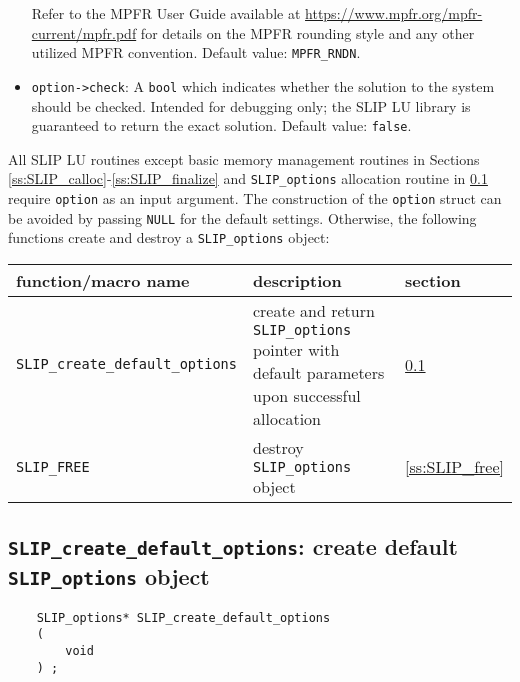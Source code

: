 \documentclass[12pt]{article}
\theoremstyle{definition}
\begin{document}
\begin{itemize}
\noindent Refer to the MPFR User Guide available at
\url{https://www.mpfr.org/mpfr-current/mpfr.pdf} for details on the MPFR
rounding style and any other utilized MPFR convention. Default value:
\verb|MPFR_RNDN|.

\item
\verb|option->check|: A \verb|bool| which indicates whether the solution to the
system should be checked. Intended for debugging only; the SLIP LU library is
guaranteed to return the exact solution. Default value: \verb|false|.

\end{itemize}

All SLIP LU routines except basic memory management routines in Sections
\ref{ss:SLIP_calloc}-\ref{ss:SLIP_finalize} and \verb|SLIP_options| allocation
routine in \ref{ss:create_default_options} require \verb|option| as an input
argument.  The construction of the \verb|option| struct can be avoided by
passing \verb|NULL| for the default settings.  Otherwise, the following
functions create and destroy a \verb|SLIP_options| object:

\begin{center}
\begin{tabular}{lp{2.5in}l}
\hline
function/macro name & description & section \\
\hline
\verb|SLIP_create_default_options|
    & create and return \verb|SLIP_options| pointer
      with default parameters upon successful allocation
    & \ref{ss:create_default_options} \\
\hline
\verb|SLIP_FREE|
    & destroy \verb|SLIP_options| object
    & \ref{ss:SLIP_free} \\
\hline
\end{tabular}
\end{center}

\cprotect\subsection{\verb|SLIP_create_default_options|: create default \verb|SLIP_options| object}
\label{ss:create_default_options}

\begin{mdframed}[userdefinedwidth=6in]
{\footnotesize
\begin{verbatim}
    SLIP_options* SLIP_create_default_options
    (
        void
    ) ;
\end{verbatim}
} \end{mdframed}
\end{document}

